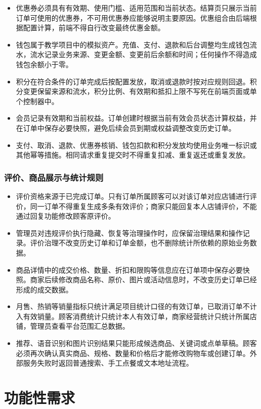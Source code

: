 \begin{itemize}
\item 优惠券必须具有有效期、使用门槛、适用范围和当前状态。结算页只展示当前订单可使用的优惠券，不可用优惠券应能够说明主要原因。优惠组合由后端根据配置计算，前端不得自行改变最终优惠金额。
\item 钱包属于教学项目中的模拟资产。充值、支付、退款和后台调整均生成钱包流水，流水记录业务来源、变更金额、变更前后余额和时间；任何操作不得造成钱包余额小于零。
\item 积分在符合条件的订单完成后按配置发放，取消或退款时按对应规则回退。积分变更保留来源和流水，积分比例、有效期和抵扣上限不写死在前端页面或单个控制器中。
\item 会员记录有效期和当前权益。订单创建时根据当前有效会员状态计算权益，并在订单中保存必要快照，避免后续会员到期或权益调整改变历史订单。
\item 支付、取消、退款、优惠券核销、钱包扣款和积分发放均使用业务唯一标识或其他幂等措施。相同请求重复提交时不得重复扣减、重复返还或重复发放。
\end{itemize}

\subsubsection{评价、商品展示与统计规则}

\begin{itemize}
\item 评价资格来源于已完成订单。只有订单所属顾客可以对该订单对应店铺进行评价，同一订单不得重复生成多条有效评价；商家只能回复本人店铺评价，不能通过回复功能修改顾客原评价。
\item 管理员对违规评价执行隐藏、恢复等治理操作时，应保留治理结果和操作记录。评价治理不改变历史订单和订单金额，也不删除统计所依赖的原始业务数据。
\item 商品详情中的成交价格、数量、折扣和限购等信息应在订单项中保存必要快照。商家后续修改商品名称、原价、图片或活动信息时，不改变历史订单已经形成的成交数据。
\item 月售、热销等销量指标只统计满足项目统计口径的有效订单，已取消订单不计入有效销量。顾客消费统计只统计本人有效订单，商家经营统计只统计所属店铺，管理员查看平台范围汇总数据。
\item 推荐、语音识别和图片识别结果只能形成候选商品、关键词或点单草稿。顾客必须再次确认真实商品、规格、数量和价格后才能修改购物车或创建订单。外部服务失败时返回普通搜索、手工点餐或文本地址流程。
\end{itemize}

\section{功能性需求}

